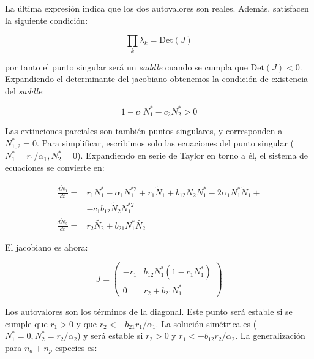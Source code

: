 \noindent La última expresión indica que los dos autovalores son reales. Además, satisfacen la siguiente condición:

\begin{equation}
\prod_{k}\lambda_{k}=\mathrm{Det}(J)
\end{equation}

\noindent por tanto el punto singular será un \textit{saddle} cuando se cumpla que  $\mathrm{Det}(J)<0$. Expandiendo el determinante del jacobiano obtenemos la condición de existencia del \textit{saddle}:

\begin{equation}
1-c_{1}N^{*}_{1}-c_{2}N^{*}_{2} >0
\end{equation}

Las extinciones parciales son también puntos singulares, y corresponden a $N^{*}_{1,2} = 0$. Para simplificar, escribimos solo las ecuaciones del punto singular  ($N^{*}_{1}=r_{1}/\alpha_{1},N^{*}_{2}=0$). Expandiendo en serie de Taylor en torno a él, el sistema de ecuaciones se convierte en:

\begin{equation}
\begin{array}{ll}
\displaystyle \frac{d\tilde{N}_{1}}{dt} = & r_{1} N^{*}_{1}-\alpha_{1}N^{*2}_{1}+r_{1}\tilde{N}_{1}+ b_{12}\tilde{N}_{2}N^{*}_1-2\alpha_{1}N^{*}_1\tilde{N}_{1} + \\
\, & - c_{1} b_{12}\tilde{N}_{2}N^{*2}_1\nonumber\\
\displaystyle \frac{d\tilde{N}_{2}}{dt} = & r_{2}\tilde{N_{2}}+ b_{21} N^{*}_1\tilde{N_{2}} 
\end{array}
\label{eq:effrateTaylorN2=0}
\end{equation}

\noindent El jacobiano es ahora:

\begin{equation*}
J = \left(
\begin{array}{rr}
-r_{1} & b_{12}N^{*}_{1}\left(1-c_{1}N^{*}_{1}\right) \\
0 & r_{2}+b_{21}N^{*}_{1}
\end{array}
\right)
\end{equation*}

Los autovalores son los términos de la diagonal. Este punto será estable si se cumple que $r_{1}>0$ y que $r_{2}<-b_{21}r_{1}/\alpha_{1}$. La solución simétrica es ($N^{*}_{1}=0,N^{*}_{2}=r_{2}/\alpha_{2}$) y será estable si  $r_{2}>0$ y $r_{1}<-b_{12}r_{2}/\alpha_{2}$. La generalización para $n_{a} + n_{p}$ especies es:
 

